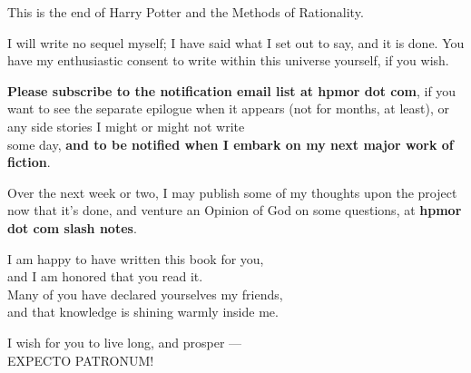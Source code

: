 \cleartoverso
\thispagestyle{empty}
{
\null\SomeVSpace
\itshape
\begin{center}
This is the end of Harry Potter and the Methods of Rationality.

\SomeVSpace
I will write no sequel myself; I have said what I set out to say, and it is
done.  You have my enthusiastic consent to write within this universe
yourself, if you wish.

\SomeVSpace
\textbf{Please subscribe to the notification email list at hpmor dot com}, if you
want to see the separate epilogue when it appears (not for months, at
least), or any side stories I might or might not write\\ some day, \textbf{and to be
notified when I embark on my next major work of fiction}.

\SomeVSpace
Over the next week or two, I may publish some of my thoughts upon the
project now that it's done, and venture an Opinion of God on some
questions, at \textbf{hpmor dot com slash notes}.


\SomeVSpace
I am happy to have written this book for you,\\
and I am honored that you read it.\\
Many of you have declared yourselves my friends,\\
and that knowledge is shining warmly inside me.

\SomeVSpace
I wish for you to live long, and prosper --- \\
EXPECTO PATRONUM!
\end{center}
}
